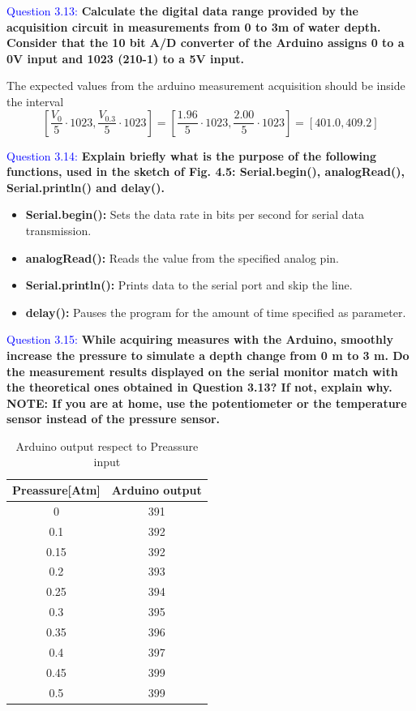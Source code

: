 \documentclass[12pt, a4papre]{article}
\begin{document}
	
	

	\textcolor{blue}{Question 3.13:}  \textbf{Calculate the digital data range provided by the acquisition circuit in measurements from 0 to 3m of water depth. Consider that the 10 bit A/D converter of the Arduino assigns 0 to a 0V input and 1023 (210-1) to a 5V input.}
	
	The expected values from the arduino measurement acquisition should be inside the interval
	\[
		[\frac{V_0}{5}\cdot1023, \frac{V_{0.3}}{5}\cdot1023] = [\frac{1.96}{5}\cdot1023, \frac{2.00}{5}\cdot1023] = [401.0,409.2]
	\]
	
	\textcolor{blue}{Question 3.14:} \textbf{Explain briefly what is the purpose of the following functions, used in the sketch of Fig. 4.5: Serial.begin(), analogRead(), Serial.println() and delay(). }
	\begin{itemize}
		\item \textbf{Serial.begin():} Sets the data rate in bits per second for serial data transmission.
		\item \textbf{analogRead():} Reads the value from the specified analog pin.
		\item \textbf{Serial.println():} Prints data to the serial port and skip the line.
		\item \textbf{delay():} Pauses the program for the amount of time specified as parameter.
	
	\end{itemize}


	\textcolor{blue}{Question 3.15:}  \textbf{While acquiring measures with the Arduino, smoothly increase the pressure to simulate a depth change from 0 m to 3 m. Do the measurement results displayed on the serial monitor match with the theoretical ones obtained in Question 3.13? If not, explain why. NOTE: If you are at home, use the potentiometer or the temperature sensor instead of the pressure sensor.}

	\begin{table}[H]
	\centering
	\begin{tabular}{||c c ||} 
	 \hline
		 Preassure[Atm] & Arduino output \\ [0.5ex] 
	 \hline\hline
	 	 0 		& 391  \\
		 0.1 		& 392  \\ 
		 0.15 	& 392  \\ 
		 0.2 		& 393  \\
		 0.25 	& 394  \\ 
		 0.3 		& 395  \\
		 0.35 	& 396  \\ 
		 0.4 		& 397  \\
		 0.45 	& 399  \\ 
		 0.5 		& 399  \\ [1ex] 
	 \hline
	\end{tabular}
	\caption{Arduino output respect to Preassure input}
	\end{table}
	
\end{document}
